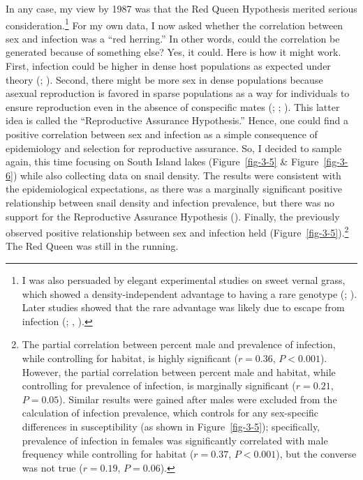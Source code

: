 \documentclass[
  american,
  letterpaper,
]{book}
\begin{document}
In any case, my view by 1987 was that the Red Queen Hypothesis merited
serious consideration.\footnote{I was also persuaded by elegant
  experimental studies on sweet vernal grass, which showed a
  density-independent advantage to having a rare genotype
  (;
  ). Later
  studies showed that the rare advantage was likely due to escape from
  infection (;
  , ).}
For my own data, I now asked whether the correlation between sex and
infection was a ``red herring.'' In other words, could the correlation
be generated because of something else? Yes, it could. Here is how it
might work. First, infection could be higher in dense host populations
as expected under theory (; ). Second, there
might be more sex in dense populations because asexual reproduction is
favored in sparse populations as a way for individuals to ensure
reproduction even in the absence of conspecific mates
(;
;
). This latter idea is
called the ``Reproductive Assurance Hypothesis.'' Hence, one could find
a positive correlation between sex and infection as a simple consequence
of epidemiology and selection for reproductive assurance. So, I decided
to sample again, this time focusing on South Island lakes
(Figure~\ref{fig-3-5} \& Figure~\ref{fig-3-6}) while also collecting
data on snail density. The results were consistent with the
epidemiological expectations, as there was a marginally significant
positive relationship between snail density and infection prevalence,
but there was no support for the Reproductive Assurance Hypothesis
(). Finally, the previously
observed positive relationship between sex and infection held
(Figure~\ref{fig-3-5}).\footnote{The partial correlation between percent
  male and prevalence of infection, while controlling for habitat, is
  highly significant (\(r = 0.36\), \(P < 0.001\)). However, the partial
  correlation between percent male and habitat, while controlling for
  prevalence of infection, is marginally significant (\(r = 0.21\),
  \(P = 0.05\)). Similar results were gained after males were excluded
  from the calculation of infection prevalence, which controls for any
  sex-specific differences in susceptibility (as shown in
  Figure~\ref{fig-3-5}); specifically, prevalence of infection in
  females was significantly correlated with male frequency while
  controlling for habitat (\(r = 0.37\), \(P < 0.001\)), but the
  converse was not true (\(r = 0.19\), \(P = 0.06\)).} The Red Queen was
still in the running.
\end{document}
